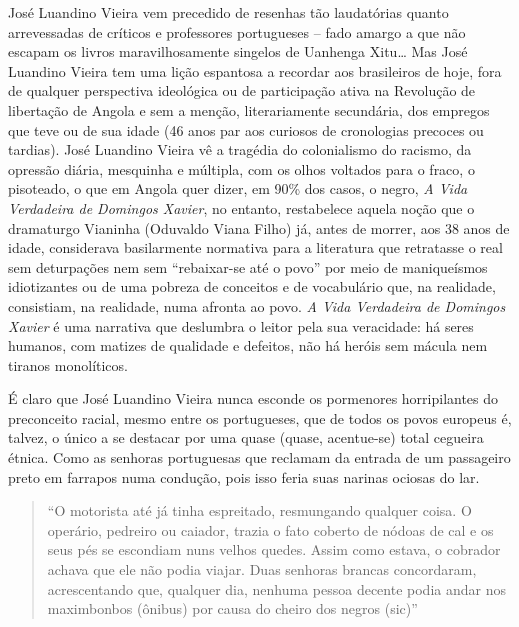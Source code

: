 \documentclass[
  letterpaper,
  DIV=11,
  numbers=noendperiod]{scrreprt}
\begin{document}
José Luandino Vieira vem precedido de resenhas tão laudatórias quanto
arrevessadas de críticos e professores portugueses -- fado amargo a que
não escapam os livros maravilhosamente singelos de Uanhenga Xitu\ldots{}
Mas José Luandino Vieira tem uma lição espantosa a recordar aos
brasileiros de hoje, fora de qualquer perspectiva ideológica ou de
participação ativa na Revolução de libertação de Angola e sem a menção,
literariamente secundária, dos empregos que teve ou de sua idade (46
anos par aos curiosos de cronologias precoces ou tardias). José Luandino
Vieira vê a tragédia do colonialismo do racismo, da opressão diária,
mesquinha e múltipla, com os olhos voltados para o fraco, o pisoteado, o
que em Angola quer dizer, em 90\% dos casos, o negro, \emph{A Vida
Verdadeira de Domingos Xavier}, no entanto, restabelece aquela noção que
o dramaturgo Vianinha (Oduvaldo Viana Filho) já, antes de morrer, aos 38
anos de idade, considerava basilarmente normativa para a literatura que
retratasse o real sem deturpações nem sem ``rebaixar-se até o povo'' por
meio de maniqueísmos idiotizantes ou de uma pobreza de conceitos e de
vocabulário que, na realidade, consistiam, na realidade, numa afronta ao
povo. \emph{A Vida Verdadeira de Domingos Xavier} é uma narrativa que
deslumbra o leitor pela sua veracidade: há seres humanos, com matizes de
qualidade e defeitos, não há heróis sem mácula nem tiranos monolíticos.

É claro que José Luandino Vieira nunca esconde os pormenores
horripilantes do preconceito racial, mesmo entre os portugueses, que de
todos os povos europeus é, talvez, o único a se destacar por uma quase
(quase, acentue-se) total cegueira étnica. Como as senhoras portuguesas
que reclamam da entrada de um passageiro preto em farrapos numa
condução, pois isso feria suas narinas ociosas do lar.

\begin{quote}
``O motorista até já tinha espreitado, resmungando qualquer coisa. O
operário, pedreiro ou caiador, trazia o fato coberto de nódoas de cal e
os seus pés se escondiam nuns velhos quedes. Assim como estava, o
cobrador achava que ele não podia viajar. Duas senhoras brancas
concordaram, acrescentando que, qualquer dia, nenhuma pessoa decente
podia andar nos maximbonbos (ônibus) por causa do cheiro dos negros
(sic)''
\end{quote}
\end{document}
